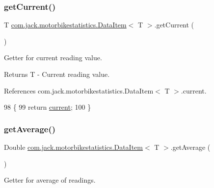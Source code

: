 \subsubsection{\texorpdfstring{get\+Current()}{getCurrent()}}
{\footnotesize\ttfamily T \hyperlink{classcom_1_1jack_1_1motorbikestatistics_1_1_data_item}{com.\+jack.\+motorbikestatistics.\+Data\+Item}$<$ T $>$.get\+Current (\begin{DoxyParamCaption}{ }\end{DoxyParamCaption})\hspace{0.3cm}{\ttfamily [inline]}}



Getter for current reading value. 

\begin{DoxyReturn}{Returns}
T -\/ Current reading value. 
\end{DoxyReturn}


References com.\+jack.\+motorbikestatistics.\+Data\+Item$<$ T $>$.\+current.


\begin{DoxyCode}
98                           \{
99         \textcolor{keywordflow}{return} \hyperlink{classcom_1_1jack_1_1motorbikestatistics_1_1_data_item_a48cf1c273c44e2181a99d56c48868d1d}{current};
100     \}
\end{DoxyCode}
\mbox{\label{classcom_1_1jack_1_1motorbikestatistics_1_1_data_item_af8e5083ad7651708f7def6b488e881d2}} 
\subsubsection{\texorpdfstring{get\+Average()}{getAverage()}}
{\footnotesize\ttfamily Double \hyperlink{classcom_1_1jack_1_1motorbikestatistics_1_1_data_item}{com.\+jack.\+motorbikestatistics.\+Data\+Item}$<$ T $>$.get\+Average (\begin{DoxyParamCaption}{ }\end{DoxyParamCaption})\hspace{0.3cm}{\ttfamily [inline]}}



Getter for average of readings. 

